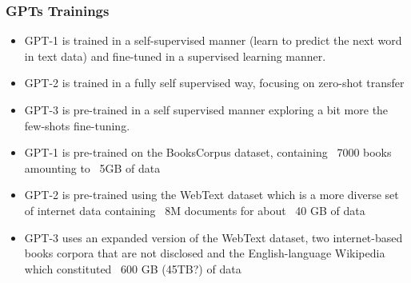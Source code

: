 







\begin{frame}[fragile]\frametitle{GPTs Trainings}


\begin{itemize}
\item GPT-1 is trained in a self-supervised manner (learn to predict the next word in text data) and fine-tuned in a supervised learning manner. 
\item GPT-2 is trained in a fully self supervised way, focusing on zero-shot transfer
\item  GPT-3 is pre-trained in a self supervised manner exploring a bit more the few-shots fine-tuning.
\item GPT-1 is pre-trained on the BooksCorpus dataset, containing ~7000 books amounting to ~5GB of data
\item GPT-2 is pre-trained using the WebText dataset which is a more diverse set of internet data containing ~8M documents for about ~40 GB of data
\item GPT-3 uses an expanded version of the WebText dataset, two internet-based books corpora that are not disclosed and the English-language Wikipedia which constituted ~600 GB (45TB?) of data
\end{itemize}	 

\end{frame}

